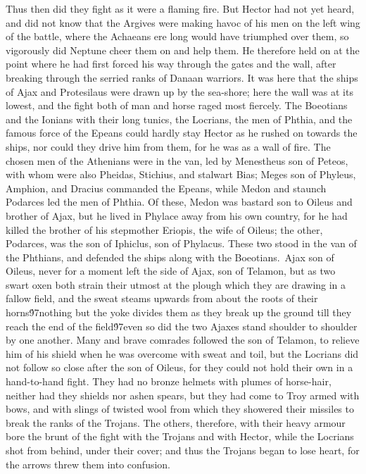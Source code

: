 {Thus then did they fight as it were a flaming fire. But Hector had not yet heard, and did not know that the Argives were making havoc of his men on the left wing of the battle, where the Achaeans ere long would have triumphed over them, so vigorously did Neptune cheer them on and help them. He therefore held on at the point where he had first forced his way through the gates and the wall, after breaking through the serried ranks of Danaan warriors. It was here that the ships of Ajax and Protesilaus were drawn up by the sea-shore; here the wall was at its lowest, and the fight both of man and horse raged most fiercely. The Boeotians and the Ionians with their long tunics, the Locrians, the men of Phthia, and the famous force of the Epeans could hardly stay Hector as he rushed on towards the ships, nor could they drive him from them, for he was as a wall of fire. The chosen men of the Athenians were in the van, led by Menestheus son of Peteos, with whom were also Pheidas, Stichius, and stalwart Bias; Meges son of Phyleus, Amphion, and Dracius commanded the Epeans, while Medon and staunch Podarces led the men of Phthia. Of these, Medon was bastard son to Oileus and brother of Ajax, but he lived in Phylace away from his own country, for he had killed the brother of his stepmother Eriopis, the wife of Oileus; the other, Podarces, was the son of Iphiclus, son of Phylacus. These two stood in the van of the Phthians, and defended the ships along with the Boeotians.\
Ajax son of Oileus, never for a moment left the side of Ajax, son of Telamon, but as two swart oxen both strain their utmost at the plough which they are drawing in a fallow field, and the sweat steams upwards from about the roots of their horns\'97nothing but the yoke divides them as they break up the ground till they reach the end of the field\'97even so did the two Ajaxes stand shoulder to shoulder by one another. Many and brave comrades followed the son of Telamon, to relieve him of his shield when he was overcome with sweat and toil, but the Locrians did not follow so close after the son of Oileus, for they could not hold their own in a hand-to-hand fight. They had no bronze helmets with plumes of horse-hair, neither had they shields nor ashen spears, but they had come to Troy armed with bows, and with slings of twisted wool from which they showered their missiles to break the ranks of the Trojans. The others, therefore, with their heavy armour bore the brunt of the fight with the Trojans and with Hector, while the Locrians shot from behind, under their cover; and thus the Trojans began to lose heart, for the arrows threw them into confusion.\
}
